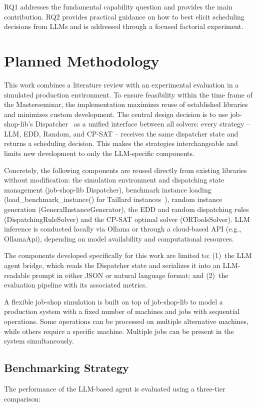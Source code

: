 \documentclass{article}
\begin{document}
RQ1 addresses the fundamental capability question and provides the main
contribution. RQ2 provides practical guidance on how to best elicit scheduling
decisions from LLMs and is addressed through a focused factorial experiment.

\section{Planned Methodology}

This work combines a literature review with an experimental evaluation in a simulated production environment. To ensure feasibility within the time frame
of the Masterseminar, the implementation maximizes reuse of established
libraries and minimizes custom development. The central design decision is to
use job-shop-lib's Dispatcher~\cite{arinoPabloo22Job_shop_lib2026} as a unified
interface between all solvers: every strategy -- LLM, EDD, Random, and CP-SAT
-- receives the same dispatcher state and returns a scheduling decision. This
makes the strategies interchangeable and limits new development to only the
LLM-specific components.

Concretely, the following components are reused directly from existing
libraries without modification: the simulation environment and dispatching
state management (job-shop-lib Dispatcher), benchmark
instance loading (load\_benchmark\_instance() for Taillard
instances~\cite{taillardBenchmarksBasicScheduling1993}), random instance generation
(GeneralInstanceGenerator), the EDD and random dispatching rules
(DispatchingRuleSolver) and the CP-SAT optimal solver
(ORToolsSolver). LLM inference is conducted locally
via Ollama or through a cloud-based API (e.g., OllamaApi), depending on
model availability and computational resources.

The components developed specifically for this work are limited to: (1)~the
LLM agent bridge, which reads the Dispatcher state and
serializes it into an LLM-readable prompt in either JSON or natural language
format; and (2)~the evaluation pipeline with its associated metrics.

A flexible job-shop simulation is built on top of job-shop-lib to
model a production system with a fixed number of machines and jobs with
sequential operations. Some operations can be processed on multiple alternative
machines, while others require a specific machine. Multiple jobs can be present
in the system simultaneously.


\subsection{Benchmarking Strategy}
The performance of the LLM-based agent is evaluated using a three-tier
comparison:
 
\end{document}
